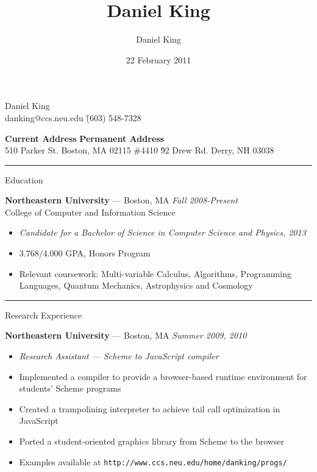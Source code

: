 \documentclass[10pt]{letter}
\author{Daniel King}
\title{Daniel King}
\date{22 February 2011}
\begin{document}
\begin{tabbing}{\Huge Daniel King} \\
\normalsize danking@ccs.neu.edu \`(603) 548-7328
\end{tabbing}

\vspace{-10pt}
\begin{tabbing}
\textbf{Current Address} \`\textbf{Permanent Address}\\
510 Parker St. Boston, MA 02115 \#4410 \`92 Drew Rd. Derry, NH 03038
\end{tabbing}\vspace{-15pt}
\rule{\linewidth}{.5pt}

{\Large Education}
\begin{tabbing}
{\large \bf Northeastern University} --- Boston, MA \` \textit{Fall 2008-Present} \\
College of Computer and Information Science
\end{tabbing}\vspace{-10pt}

\begin{itemize}
\setlength\itemsep{1pt}
\item [] {\textit{Candidate for a Bachelor of Science in Computer Science and
    Physics, 2013}}
\item{3.768/4.000 GPA, Honors Program}
\item{Relevant coursework: Multi-variable Calculus, Algorithms, Programming
  Languages, Quantum Mechanics, Astrophysics and Cosmology}
\end{itemize}

\rule{\linewidth}{.5pt}

{\Large Research Experience}

\begin{tabbing}
{\large \bf Northeastern University} --- Boston, MA \` \textit{Summer 2009, 2010}

\end{tabbing}
\begin{itemize}
\setlength\itemsep{1pt}
\item [] \textit{Research Assistant --- Scheme to JavaScript compiler}
\item Implemented a compiler to provide a browser-based runtime environment for students' Scheme programs
\item Created a trampolining interpreter to achieve tail call optimization in JavaScript
\item Ported a student-oriented graphics library from Scheme to the browser
\item Examples available at \texttt{http://www.ccs.neu.edu/home/danking/progs/}
\end{itemize}
\end{document}
